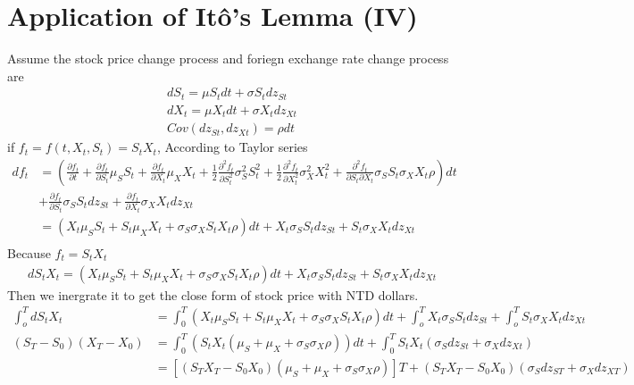 \documentclass[12pt]{article}
\begin{document}
\section{Application of It\^o's Lemma (IV)}
Assume the stock price change process and foriegn exchange rate change process are
\begin{align*}
    dS_t = \mu S_t dt + \sigma S_t dz_{St}\\
    dX_t = \mu X_t dt + \sigma X_t dz_{Xt}\\
    Cov(dz_{St}, dz_{Xt}) = \rho dt
\end{align*}
if $f_t = f(t, X_t, S_t) = S_t X_t$, According to Taylor series
\begin{align*}
    df_t &= (\frac{\partial f_t}{\partial t} + \frac{\partial f_t}{\partial S_t}\mu_S S_t + \frac{\partial f_t}{\partial X_t}\mu_X X_t + \frac{1}{2}\frac{\partial^2 f_t}{\partial S_t^2}\sigma^2_S S_t^2 + \frac{1}{2}\frac{\partial^2 f_t}{\partial X_t^2}\sigma^2_X X_t^2 + \frac{\partial^2 f_t}{\partial S_t \partial X_t}\sigma_S S_t \sigma_X X_t \rho)dt \\
    &+ \frac{\partial f_t}{\partial S_t}\sigma_S S_t dz_{St} + \frac{\partial f_t}{\partial X_t}\sigma_X X_t dz_{Xt}\\
    &= (X_t\mu_S S_t + S_t \mu_X X_t + \sigma_S\sigma_X S_t X_t\rho)dt + X_t \sigma_S S_t dz_{St} + S_t \sigma_X X_t dz_{Xt}\\
\end{align*}
Because $f_t = S_t X_t$
\begin{align*}
    dS_t X_t = (X_t\mu_S S_t + S_t \mu_X X_t + \sigma_S\sigma_X S_t X_t\rho)dt + X_t \sigma_S S_t dz_{St} + S_t \sigma_X X_t dz_{Xt} 
\end{align*}
Then we inergrate it to get the close form of stock price with NTD dollars.
\begin{align*}
    \int_o^T dS_t X_t &= \int_0^T (X_t\mu_S S_t + S_t \mu_X X_t + \sigma_S\sigma_X S_t X_t\rho)dt + \int_o^T X_t \sigma_S S_t dz_{St} + \int_o^T S_t \sigma_X X_t dz_{Xt}\\
    (S_T-S_0)(X_T-X_0) &= \int_0^T(S_t X_t(\mu_S + \mu_X+\sigma_S\sigma_X\rho))dt + \int_0^T S_t X_t(\sigma_S dz_{St} + \sigma_X dz_{Xt})\\
    &= [(S_T X_T - S_0 X_0)(\mu_S + \mu_X+\sigma_S\sigma_X\rho)]T + (S_T X_T - S_0 X_0)(\sigma_S dz_{ST} + \sigma_X dz_{XT})
\end{align*}
\end{document}

